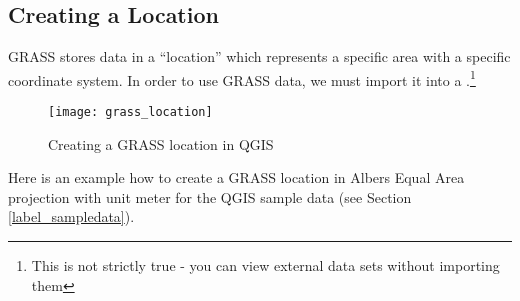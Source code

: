 \subsection{Creating a Location}\label{sec:create_loc}

GRASS stores data in a ``location'' which represents a specific area with a 
specific coordinate system. In order to use GRASS data, we must import it 
into a .\footnote{This is not strictly true - you can 
view external data sets without importing them}

\begin{figure}[ht]
   \begin{center}
   \caption{Creating a GRASS location in QGIS}\label{fig:grass_location}\smallskip
   \texttt{[image: grass\_location]}
\end{center}  
\end{figure}

Here is an example how to create a GRASS location in Albers Equal Area 
projection with unit meter for the QGIS sample data (see Section \ref{label_sampledata}). 

